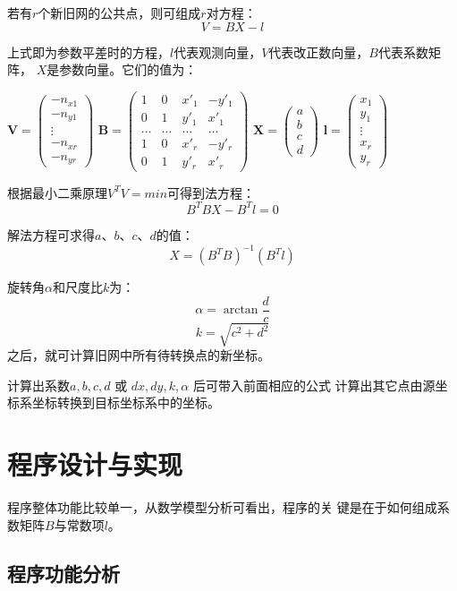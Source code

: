若有$r$个新旧网的公共点，则可组成$r$对方程：
$$V=BX-l$$

上式即为参数平差时的方程，$l$代表观测向量，$V$代表改正数向量，$B$代表系数矩阵，
$X$是参数向量。它们的值为：

$\mathbf{V}=
\left(\begin{array}{c}
-n_{x1} \\ -n_{y1} \\ \vdots \\ -n_{xr} \\ -n_{yr}
\end{array}\right)$
$\mathbf{B}=
\left(\begin{array}{cccc}
1 & 0 & x'_1 & -y'_1 \\
0 & 1 & y'_1 &  x'_1 \\
\dots & \dots & \ldots & \ldots \\
1 & 0 & x'_r & -y'_r \\
0 & 1 & y'_r &  x'_r
\end{array}\right)$
$\mathbf{X}=
\left(\begin{array}{c}
a \\ b \\ c \\ d
\end{array}\right)$
$\mathbf{l}=
\left(\begin{array}{c}
x_1 \\ y_1 \\ \vdots \\ x_r \\ y_r
\end{array}\right)$

根据最小二乘原理$V^TV=min$可得到法方程：
$$B^TBX-B^Tl=0$$

解法方程可求得$a$、$b$、$c$、$d$的值：
$$X=(B^TB)^{-1}(B^Tl)$$

旋转角$\alpha$和尺度比$k$为：
$$\alpha=\arctan\frac{d}{c}$$
$$k=\sqrt{c^2+d^2}$$
之后，就可计算旧网中所有待转换点的新坐标。

计算出系数$a,b,c,d$ 或 $dx, dy, k, \alpha$ 后可带入前面相应的公式
计算出其它点由源坐标系坐标转换到目标坐标系中的坐标。


\section{程序设计与实现}

程序整体功能比较单一，从数学模型分析可看出，程序的关
键是在于如何组成系数矩阵$B$与常数项$l$。

\subsection{程序功能分析}

